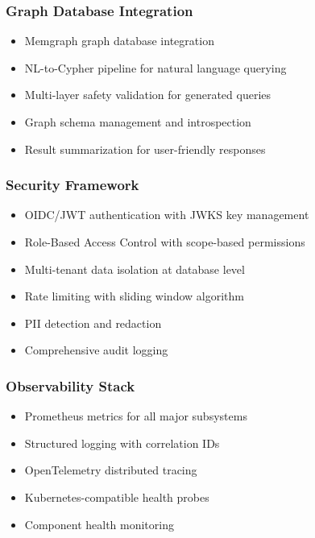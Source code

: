 \subsubsection{Graph Database Integration}

\begin{itemize}
    \item Memgraph graph database integration
    \item NL-to-Cypher pipeline for natural language querying
    \item Multi-layer safety validation for generated queries
    \item Graph schema management and introspection
    \item Result summarization for user-friendly responses
\end{itemize}

\subsubsection{Security Framework}

\begin{itemize}
    \item OIDC/JWT authentication with JWKS key management
    \item Role-Based Access Control with scope-based permissions
    \item Multi-tenant data isolation at database level
    \item Rate limiting with sliding window algorithm
    \item PII detection and redaction
    \item Comprehensive audit logging
\end{itemize}

\subsubsection{Observability Stack}

\begin{itemize}
    \item Prometheus metrics for all major subsystems
    \item Structured logging with correlation IDs
    \item OpenTelemetry distributed tracing
    \item Kubernetes-compatible health probes
    \item Component health monitoring
\end{itemize}

